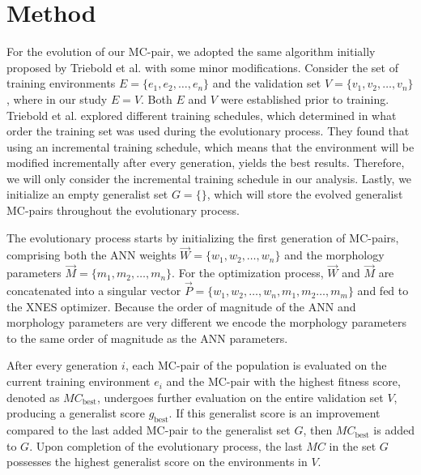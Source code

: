 \section{Method}
    For the evolution of our MC-pair, we adopted the same algorithm initially proposed by Triebold et al. \cite{Corinna_Triebold} with some minor modifications. Consider the set of training environments $E = \{e_1, e_2, \ldots, e_n\}$ and the validation set $V = \{v_1, v_2, \ldots, v_n\}$, where in our study $E = V$. Both $E$ and $V$ were established prior to training. Triebold et al. explored different training schedules, which determined in what order the training set was used during the evolutionary process. They found that using an incremental training schedule, which means that the environment will be modified incrementally after every generation, yields the best results. Therefore, we will only consider the incremental training schedule in our analysis. Lastly, we initialize an empty generalist set $G = \{\}$, which will store the evolved generalist MC-pairs throughout the evolutionary process.

    The evolutionary process starts by initializing the first generation of MC-pairs, comprising both the ANN weights $\overrightarrow{W} = \{w_1, w_2, \ldots, w_n\}$ and the morphology parameters $\overrightarrow{M} = \{m_1, m_2, \ldots, m_n\}$. For the optimization process, $\overrightarrow{W}$ and $\overrightarrow{M}$ are concatenated into a singular vector $\overrightarrow{P} = \{w_1, w_2, \ldots, w_n, m_1, m_2 \ldots, m_m\}$ and fed to the XNES optimizer. Because the order of magnitude of the ANN and morphology parameters are very different we encode the morphology parameters to the same order of magnitude as the ANN parameters.

    After every generation $i$, each MC-pair of the population is evaluated on the current training environment $e_i$ and the MC-pair with the highest fitness score, denoted as $MC_{\text{best}}$, undergoes further evaluation on the entire validation set $V$, producing a generalist score $g_{\text{best}}$. If this generalist score is an improvement compared to the last added MC-pair to the generalist set $G$, then $MC_{\text{best}}$ is added to $G$. Upon completion of the evolutionary process, the last $MC$ in the set $G$ possesses the highest generalist score on the environments in $V$.

